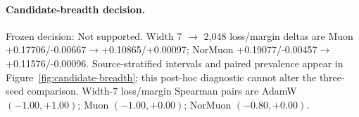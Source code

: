 \paragraph{Candidate-breadth decision.}
Frozen decision: Not supported. Width 7 $\rightarrow$ 2,048 loss/margin deltas are Muon +0.17706/-0.00667$\rightarrow$+0.10865/+0.00097; NorMuon +0.19077/-0.00457$\rightarrow$+0.11576/-0.00096. Source-stratified intervals and paired prevalence appear in Figure~\ref{fig:candidate-breadth}; this post-hoc diagnostic cannot alter the three-seed comparison. Width-7 loss/margin Spearman pairs are AdamW $(-1.00,+1.00)$; Muon $(-1.00,+0.00)$; NorMuon $(-0.80,+0.00)$.
